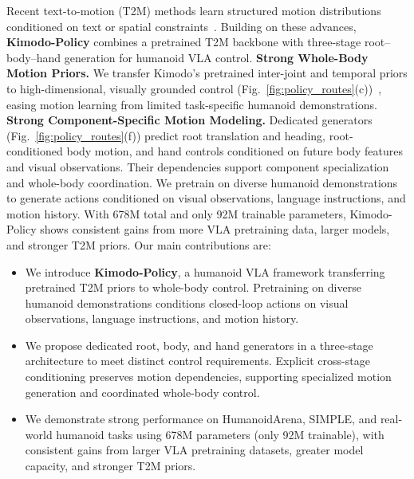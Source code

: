 Recent text-to-motion (T2M) methods learn structured motion distributions conditioned on text or spatial constraints~\cite{temos,mdm,mld,t2mgpt,momask,omnicontrol}.
Building on these advances, \textbf{Kimodo-Policy} combines a pretrained T2M backbone with three-stage root--body--hand generation for humanoid VLA control.
\textbf{ Strong Whole-Body Motion Priors.}
We transfer Kimodo's pretrained inter-joint and temporal priors to high-dimensional, visually grounded control (Fig.~\ref{fig:policy_routes}(c))~\cite{kimodo}, easing motion learning from limited task-specific humanoid demonstrations.
\textbf{ Strong Component-Specific Motion Modeling.}
Dedicated generators (Fig.~\ref{fig:policy_routes}(f)) predict root translation and heading, root-conditioned body motion, and hand controls conditioned on future body features and visual observations. Their dependencies support component specialization and whole-body coordination.
We pretrain on diverse humanoid demonstrations to generate actions conditioned on visual observations, language instructions, and motion history.
With 678M total and only 92M trainable parameters, Kimodo-Policy shows consistent gains from more VLA pretraining data, larger models, and stronger T2M priors. Our main contributions are:
\begin{itemize}
  \item We introduce \textbf{Kimodo-Policy}, a humanoid VLA framework transferring pretrained T2M priors to whole-body control. Pretraining on diverse humanoid demonstrations conditions closed-loop actions on visual observations, language instructions, and motion history.

  \item We propose dedicated root, body, and hand generators in a three-stage architecture to meet distinct control requirements. Explicit cross-stage conditioning preserves motion dependencies, supporting specialized motion generation and coordinated whole-body control.

  \item We demonstrate strong performance on HumanoidArena, SIMPLE, and real-world humanoid tasks using 678M parameters (only 92M trainable), with consistent gains from larger VLA pretraining datasets, greater model capacity, and stronger T2M priors.
\end{itemize}
